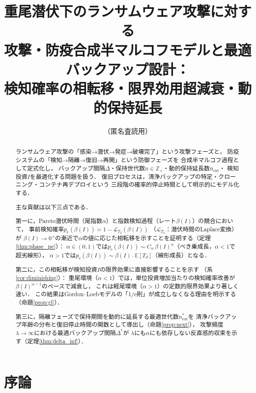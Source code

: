 \documentclass[12pt,a4paper]{article}
\theoremstyle{plain}
\theoremstyle{definition}
\theoremstyle{remark}
\newcommand{\E}{\mathbb{E}}
\newcommand{\Z}{\mathbb{Z}}
\newcommand{\calL}{\mathcal{L}}
\newcommand{\pe}{p_{\mathrm{e}}}
\newcommand{\betaI}{\beta(I)}
\newcommand{\Dopt}{\Delta^{*}}
\begin{document}

\title{%
重尾潜伏下のランサムウェア攻撃に対する\\
攻撃・防疫合成半マルコフモデルと最適バックアップ設計：\\
検知確率の相転移・限界効用超減衰・動的保持延長}
\author{（匿名査読用）}
\date{}
\maketitle

\begin{abstract}
ランサムウェア攻撃の「感染→潜伏→発症→破壊完了」という攻撃フェーズと，
防疫システムの「検知→隔離→復旧→再開」という防御フェーズを
合成半マルコフ過程として定式化し，
バックアップ間隔$\Delta$・保持世代数$n\in\Z_+$・動的保持延長数$n_{\mathrm{ext}}$・
検知投資$I$を最適化する問題を扱う．
復旧プロセスは，清浄バックアップの特定・クローニング・コンテナ再デプロイという
三段階の確率的停止時間として明示的にモデル化する．

主な貢献は以下三点である．

第一に，Pareto潜伏時間（尾指数$\alpha$）と指数検知過程（レート$\betaI$）の競合において，
事前検知確率$\pe(\betaI) = 1 - \calL_{T_d}(\betaI)$
（$\calL_{T_d}$：潜伏時間のLaplace変換）が
$\betaI\to0^+$の漸近で$\alpha$の値に応じた相転移を示すことを証明する（定理\ref{thm:phase_pe}）：
$\alpha\in(0,1)$では$\pe(\betaI)\sim C_\alpha\,\betaI^\alpha$（べき乗成長，$\alpha<1$で超劣線形），
$\alpha>1$では$\pe(\betaI)\sim\betaI\cdot\E[T_d]$（線形成長）となる．

第二に，この相転移が検知投資$I$の限界効果に直接影響することを示す
（系\ref{cor:diminishing}）：
重尾環境（$\alpha<1$）では，単位投資増加当たりの検知確率改善が$\betaI^{\alpha-1}$のペースで減衰し，
これは軽尾環境（$\alpha>1$）の定数的限界効果より著しく速い．
この結果はGordon--Loebモデルの「1/e則」が成立しなくなる理由を明示する
（命題\ref{prop:gl}）．

第三に，隔離フェーズで保持期間を動的に延長する最適世代数$n_{\mathrm{ext}}^*$を
清浄バックアップ年齢の分布と復旧停止時間の関数として導出し（命題\ref{prop:next}），
攻撃頻度$\lambda\to\infty$における最適バックアップ間隔$\Dopt$が
$\lambda$にも$\alpha$にも依存しない反直感的収束を示す（定理\ref{thm:delta_inf}）．
\end{abstract}

\section{序論}
\label{sec:intro}
\end{document}
